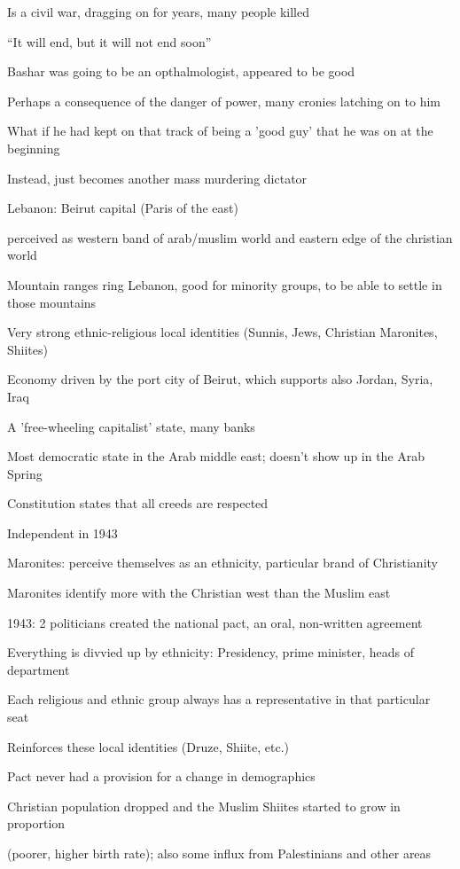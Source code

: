 \documentclass[12pt]{article}
\begin{document}
Is a civil war, dragging on for years, many people killed

``It will end, but it will not end soon''

Bashar was going to be an opthalmologist, appeared to be good

Perhaps a consequence of the danger of power, many cronies latching on to him

What if he had kept on that track of being a 'good guy' that he was on at the beginning

Instead, just becomes another mass murdering dictator

\newpage
\noindent
Lebanon: Beirut capital (Paris of the east)

perceived as western band of arab/muslim world and eastern edge of the christian world

Mountain ranges ring Lebanon, good for minority groups, to be able to settle in those mountains

Very strong ethnic-religious local identities (Sunnis, Jews, Christian Maronites, Shiites)

Economy driven by the port city of Beirut, which supports also Jordan, Syria, Iraq

A 'free-wheeling capitalist' state, many banks

Most democratic state in the Arab middle east; doesn't show up in the Arab Spring

Constitution states that all creeds are respected

Independent in 1943

Maronites: perceive themselves as an ethnicity, particular brand of Christianity

Maronites identify more with the Christian west than the Muslim east

1943: 2 politicians created the national pact, an oral, non-written agreement

Everything is divvied up by ethnicity: Presidency, prime minister, heads of department

Each religious and ethnic group always has a representative in that particular seat

Reinforces these local identities (Druze, Shiite, etc.)

Pact never had a provision for a change in demographics

Christian population dropped and the Muslim Shiites started to grow in proportion 

(poorer, higher birth rate); also some influx from Palestinians and other areas
\end{document}
